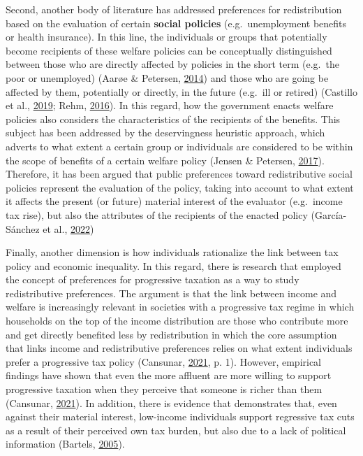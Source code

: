 \documentclass[
  12pt,
]{book}
\begin{document}
Second, another body of literature has addressed preferences for redistribution based on the evaluation of certain \textbf{social policies} (e.g.~unemployment benefits or health insurance). In this line, the individuals or groups that potentially become recipients of these welfare policies can be conceptually distinguished between those who are directly affected by policies in the short term (e.g.~the poor or unemployed) (Aarøe \& Petersen, \protect\hyperlink{ref-Aaroe2014}{2014}) and those who are going be affected by them, potentially or directly, in the future (e.g.~ill or retired) (Castillo et al., \protect\hyperlink{ref-castillo_deserving_2019}{2019}; Rehm, \protect\hyperlink{ref-rehm_risk_2016}{2016}). In this regard, how the government enacts welfare policies also considers the characteristics of the recipients of the benefits. This subject has been addressed by the deservingness heuristic approach, which adverts to what extent a certain group or individuals are considered to be within the scope of benefits of a certain welfare policy (Jensen \& Petersen, \protect\hyperlink{ref-Jensen2017}{2017}). Therefore, it has been argued that public preferences toward redistributive social policies represent the evaluation of the policy, taking into account to what extent it affects the present (or future) material interest of the evaluator (e.g.~income tax rise), but also the attributes of the recipients of the enacted policy (García-Sánchez et al., \protect\hyperlink{ref-garcia-sanchez_two_2022}{2022})

Finally, another dimension is how individuals rationalize the link between tax policy and economic inequality. In this regard, there is research that employed the concept of preferences for progressive taxation as a way to study redistributive preferences. The argument is that the link between income and welfare is increasingly relevant in societies with a progressive tax regime in which households on the top of the income distribution are those who contribute more and get directly benefited less by redistribution in which the core assumption that links income and redistributive preferences relies on what extent individuals prefer a progressive tax policy (Cansunar, \protect\hyperlink{ref-cansunar_who_2021}{2021}, p. 1). However, empirical findings have shown that even the more affluent are more willing to support progressive taxation when they perceive that someone is richer than them (Cansunar, \protect\hyperlink{ref-cansunar_who_2021}{2021}). In addition, there is evidence that demonstrates that, even against their material interest, low-income individuals support regressive tax cuts as a result of their perceived own tax burden, but also due to a lack of political information (Bartels, \protect\hyperlink{ref-bartels_homer_2005}{2005}).
\end{document}
